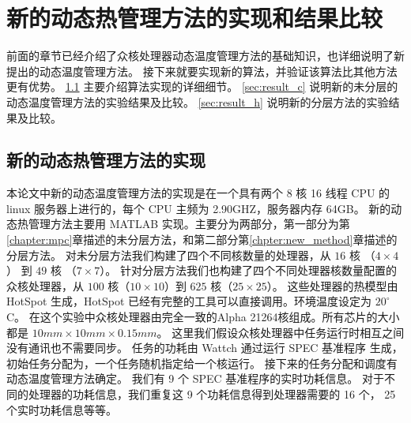 
\chapter{新的动态热管理方法的实现和结果比较}\label{sec:exp}

前面的章节已经介绍了众核处理器动态温度管理方法的基础知识，也详细说明了新提出的动态温度管理方法。
接下来就要实现新的算法，并验证该算法比其他方法更有优势。
 \ref{sec:method_implement} 主要介绍算法实现的详细细节。 
 \ref{sec:result_c} 说明新的未分层的动态温度管理方法的实验结果及比较。
 \ref{sec:result_h} 说明新的分层方法的实验结果及比较。
\section{新的动态热管理方法的实现}\label{sec:method_implement}
本论文中新的动态温度管理方法的实现是在一个具有两个 8 核 16 线程 CPU 的 linux 服务器上进行的，每个 CPU 主频为 2.90GHZ，服务器内存 64GB。
新的动态热管理方法主要用 MATLAB 实现。主要分为两部分，第一部分为第\ref{chapter:mpc}章描述的未分层方法，和第二部分第\ref{chpter:new_method}章描述的分层方法。
对未分层方法我们构建了四个不同核数量的处理器，从 $16$  核 （$4 \times 4$） 到 $49$  核 （$7 \times 7$）。
针对分层方法我们也构建了四个不同处理器核数量配置的众核处理器，从 $100$ 核（$10 \times 10$）到 $625$ 核（$25 \times 25$）。
这些处理器的热模型由 HotSpot 生成，HotSpot 已经有完整的工具可以直接调用。环境温度设定为 $20^{\circ}$C。
在这个实验中众核处理器由完全一致的Alpha 21264核组成。所有芯片的大小都是 $10mm \times 10mm \times 0.15mm$。
这里我们假设众核处理器中任务运行时相互之间没有通讯也不需要同步。
任务的功耗由 Wattch 通过运行 SPEC 基准程序   生成，初始任务分配为，一个任务随机指定给一个核运行。
接下来的任务分配和调度有动态温度管理方法确定。
我们有 9 个 SPEC 基准程序的实时功耗信息。
对于不同的处理器的功耗信息，我们重复这 9 个功耗信息得到处理器需要的 16 个， 25个实时功耗信息等等。

